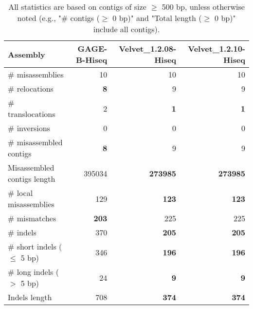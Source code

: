 \documentclass[12pt,a4paper]{article}
\begin{document}
\begin{table}[ht]
\begin{center}
\caption{All statistics are based on contigs of size $\geq$ 500 bp, unless otherwise noted (e.g., "\# contigs ($\geq$ 0 bp)" and "Total length ($\geq$ 0 bp)" include all contigs).}
\begin{tabular}{|l*{3}{|r}|}
\hline
Assembly & GAGE-B-Hiseq & Velvet\_1.2.08-Hiseq & Velvet\_1.2.10-Hiseq \\ \hline
\# misassemblies & 10 & 10 & 10 \\ \hline
\hspace{5mm}\# relocations & {\bf 8} & 9 & 9 \\ \hline
\hspace{5mm}\# translocations & 2 & {\bf 1} & {\bf 1} \\ \hline
\hspace{5mm}\# inversions & 0 & 0 & 0 \\ \hline
\# misassembled contigs & {\bf 8} & 9 & 9 \\ \hline
Misassembled contigs length & 395034 & {\bf 273985} & {\bf 273985} \\ \hline
\# local misassemblies & 129 & {\bf 123} & {\bf 123} \\ \hline
\# mismatches & {\bf 203} & 225 & 225 \\ \hline
\# indels & 370 & {\bf 205} & {\bf 205} \\ \hline
\hspace{5mm}\# short indels ($\leq$ 5 bp) & 346 & {\bf 196} & {\bf 196} \\ \hline
\hspace{5mm}\# long indels ($>$ 5 bp) & 24 & {\bf 9} & {\bf 9} \\ \hline
Indels length & 708 & {\bf 374} & {\bf 374} \\ \hline
\end{tabular}
\end{center}
\end{table}
\end{document}
